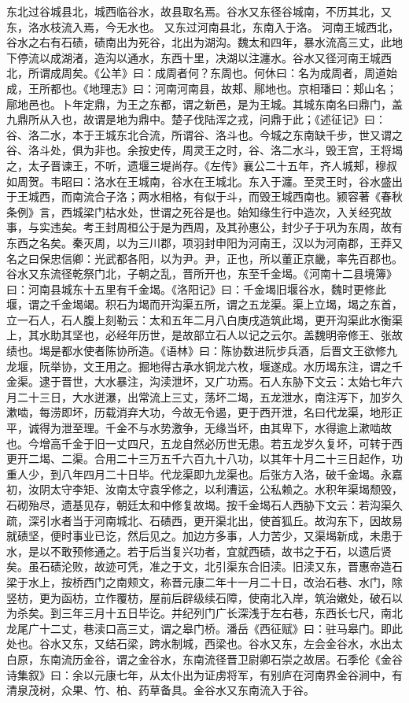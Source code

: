 \documentclass[12pt,UTF8]{ctexbook}
\begin{document}
东北过谷城县北，城西临谷水，故县取名焉。谷水又东径谷城南，不历其北，又东，洛水枝流入焉，今无水也。
又东过河南县北，东南入于洛。
河南王城西北，谷水之右有石碛，碛南出为死谷，北出为湖沟。魏太和四年，暴水流高三丈，此地下停流以成湖渚，造沟以通水，东西十里，决湖以注瀍水。谷水又径河南王城西北，所谓成周矣。《公羊》曰：成周者何？东周也。何休曰：名为成周者，周道始成，王所都也。《地理志》曰：河南河南县，故郏、鄏地也。京相璠曰：郏山名；鄏地邑也。卜年定鼎，为王之东都，谓之新邑，是为王城。其城东南名曰鼎门，盖九鼎所从入也，故谓是地为鼎中。楚子伐陆浑之戎，问鼎于此；《述征记》曰：谷、洛二水，本于王城东北合流，所谓谷、洛斗也。今城之东南缺千步，世又谓之谷、洛斗处，俱为非也。余按史传，周灵王之时，谷、洛二水斗，毁王宫，王将堨之，太子晋谏王，不听，遗堰三堤尚存。《左传》襄公二十五年，齐人城郏，穆叔如周贺。韦昭曰：洛水在王城南，谷水在王城北。东入于瀍。至灵王时，谷水盛出于王城西，而南流合子洛；两水相格，有似于斗，而毁王城西南也。颍容著《春秋条例》言，西城梁门枯水处，世谓之死谷是也。始知缘生行中造次，入关经究故事，与实违矣。考王封周桓公于是为西周，及其孙惠公，封少子于巩为东周，故有东西之名矣。秦灭周，以为三川郡，项羽封申阳为河南王，汉以为河南郡，王莽又名之曰保忠信卿：光武都各阳，以为尹。尹，正也，所以董正京畿，率先百郡也。谷水又东流径乾祭门北，子朝之乱，晋所开也，东至千金堨。《河南十二县境簿》曰：河南县城东十五里有千金堨。《洛阳记》曰：千金堨旧堰谷水，魏时更修此堰，谓之千金堨竭。积石为堨而开沟渠五所，谓之五龙渠。渠上立堨，堨之东首，立一石人，石人腹上刻勒云：太和五年二月八白庚戌造筑此堨，更开沟渠此水衡渠上，其水助其坚也，必经年历世，是故部立石人以记之云尔。盖魏明帝修王、张故绩也。堨是都水使者陈协所造。《语林》曰：陈协数进阮步兵酒，后晋文王欲修九龙堰，阮举协，文王用之。掘地得古承水铜龙六枚，堰遂成。水历堨东注，谓之千金渠。逮于晋世，大水暴注，沟渎泄坏，又广功焉。石人东胁下文云：太始七年六月二十三日，大水迸瀑，出常流上三丈，荡坏二堨，五龙泄水，南注泻下，加岁久漱啮，每涝即坏，历载消弃大功，今故无令遏，更于西开泄，名曰代龙渠，地形正平，诚得为泄至理。千金不与水势激争，无缘当坏，由其卑下，水得逾上漱啮故也。今增高千金于旧一丈四尺，五龙自然必历世无患。若五龙岁久复坏，可转于西更开二堨、二渠。合用二十三万五千六百九十八功，以其年十月二十三日起作，功重人少，到八年四月二十日毕。代龙渠即九龙渠也。后张方入洛，破千金堨。永嘉初，汝阴太守李矩、汝南太守袁孚修之，以利漕运，公私赖之。水积年渠堨颓毁，石砌殆尽，遗基见存，朝廷太和中修复故堨。按千金堨石人西胁下文云：若沟渠久疏，深引水者当于河南城北、石碛西，更开渠北出，使首狐丘。故沟东下，因故易就碛坚，便时事业已讫，然后见之。加边方多事，人力苦少，又渠堨新成，未患于水，是以不敢预修通之。若于后当复兴功者，宜就西碛，故书之于石，以遗后贤矣。虽石碛沦败，故迹可凭，准之于文，北引渠东合旧渎。旧渎又东，晋惠帝造石梁于水上，按桥西门之南颊文，称晋元康二年十一月二十日，改治石巷、水门，除竖枋，更为函枋，立作覆枋，屋前后辟级续石障，使南北入岸，筑治嫩处，破石以为杀矣。到三年三月十五日毕讫。并纪列门广长深浅于左右巷，东西长七尺，南北龙尾广十二丈，巷渎口高三丈，谓之皋门桥。潘岳《西征赋》曰：驻马皋门。即此处也。谷水又东，又结石梁，跨水制城，西梁也。谷水又东，左会金谷水，水出太白原，东南流历金谷，谓之金谷水，东南流径晋卫尉卿石崇之故居。石季伦《金谷诗集叙》曰：余以元康七年，从太仆出为证虏将军，有别庐在河南界金谷涧中，有清泉茂树，众果、竹、柏、药草备具。金谷水又东南流入于谷。
\end{document}
